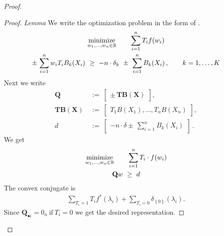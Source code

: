 \begin{proof}
\begin{lemma}
  \end{lemma}
  \begin{proof}
    \emph{Lemma}
    We write the optimization problem in the form of \cite{Tseng1991}.
    \begin{gather*}
    \underset{w_1, \ldots, w_n \in \R}{\mathrm{minimize}}
    \qquad
    \sum_{i = 1}^{n} T_i f(w_i)
    \\
      \pm\,\sum_{i = 1}^{n} w_i T_i B_k(X_i)
      \ 
      \ge
      \ 
      -n\cdot\delta_k
      \ 
      \pm 
      \ 
      \sum_{i = 1}^{n} B_k(X_i)
      \,,
      \qquad
      k=1,\ldots,K
    \end{gather*}
    Next we write
 \begin{align*}
    \mathbf{Q}
    &
    \ 
    :=
    \ 
    \begin{bmatrix}
      \pm\,\mathbf{TB}(\mathbf{X})
    \end{bmatrix}
    ,
    \\
    \mathbf{TB}(\mathbf{X})
    &
    \ 
    :=
    \ 
    \begin{bmatrix}
      T_1B(X_1), \ldots, T_nB(X_n)
    \end{bmatrix}
    ,
    \\
    d
    &
    \ 
    :=
    \ 
    \begin{bmatrix}
      -n\cdot\delta 
      \pm\,
      \sum_{i = 1}^{n} B_k(X_i)
    \end{bmatrix}
    \,.
  \end{align*}
We get
\begin{gather*}
    \underset{w_1, \ldots, w_n \in \R}{\mathrm{minimize}}
    \qquad
    \sum_{i = 1}^{n} T_i \cdot f(w_i)
    \\
    \mathbf{Q}w 
    \ 
    \ge
    \ 
    d
\end{gather*}
The convex conjugate is
\begin{gather*}
  \sum_{T_i=1} T_i f^*(\lambda_i)
  +
  \sum_{T_i=0} 
  \delta_{\left\{ 0 \right\}}(\lambda_i)
  .
\end{gather*}
Since
$
\mathbf{Q}_{\bullet i}=\mathrm{0}_n
\ 
\text{if}
\ 
T_i=0
$
we get the desired representation. 
  \end{proof}


\end{proof}
